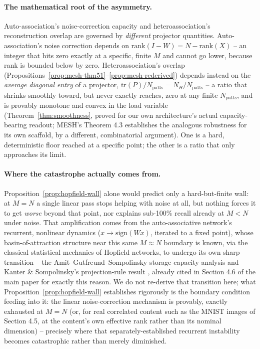 \documentclass[11pt]{article}
\begin{document}
\paragraph{The mathematical root of the asymmetry.} Auto-association's noise-correction capacity
and heteroassociation's reconstruction overlap are governed by \emph{different} projector
quantities. Auto-association's noise correction depends on $\mathrm{rank}(I-W) = N-\mathrm{rank}(X)$
-- an integer that hits zero exactly at a specific, finite $M$ and cannot go lower, because rank is
bounded below by zero. Heteroassociation's overlap (Propositions~\ref{prop:mesh-thm51}--\ref{prop:mesh-rederived})
depends instead on the \emph{average diagonal entry} of a projector, $\mathrm{tr}(P)/N_{\mathrm{patts}}=N_H/N_{\mathrm{patts}}$
-- a ratio that shrinks smoothly toward, but never exactly reaches, zero at any finite
$N_{\mathrm{patts}}$, and is provably monotone and convex in the load variable
(Theorem~\ref{thm:smoothness}, proved for our own architecture's actual capacity-bearing readout;
MESH's Theorem 4.3 establishes the analogous robustness for its own scaffold, by a different,
combinatorial argument). One is a hard, deterministic floor reached at a specific point; the other
is a ratio that only approaches its limit.

\paragraph{Where the catastrophe actually comes from.} Proposition~\ref{prop:hopfield-wall} alone
would predict only a hard-but-finite wall: at $M=N$ a single linear pass stops helping with noise
at all, but nothing forces it to get \emph{worse} beyond that point, nor explains sub-100\% recall
already at $M<N$ under noise. That amplification comes from the auto-associative network's
recurrent, nonlinear dynamics ($x\to\mathrm{sign}(Wx)$, iterated to a fixed point), whose
basin-of-attraction structure near this same $M\approx N$ boundary is known, via the classical
statistical mechanics of Hopfield networks, to undergo its own sharp transition -- the
Amit--Gutfreund--Sompolinsky storage-capacity analysis and Kanter \& Sompolinsky's projection-rule
result \cite{ags1987,kanter1987}, already cited in Section 4.6 of the main paper for exactly this
reason. We do not re-derive that transition here; what Proposition~\ref{prop:hopfield-wall}
establishes rigorously is the boundary condition feeding into it: the linear noise-correction
mechanism is provably, exactly exhausted at $M=N$ (or, for real correlated content such as the
MNIST images of Section 4.5, at the content's own effective rank rather than its nominal
dimension) -- precisely where that separately-established recurrent instability becomes
catastrophic rather than merely diminished.
\end{document}
